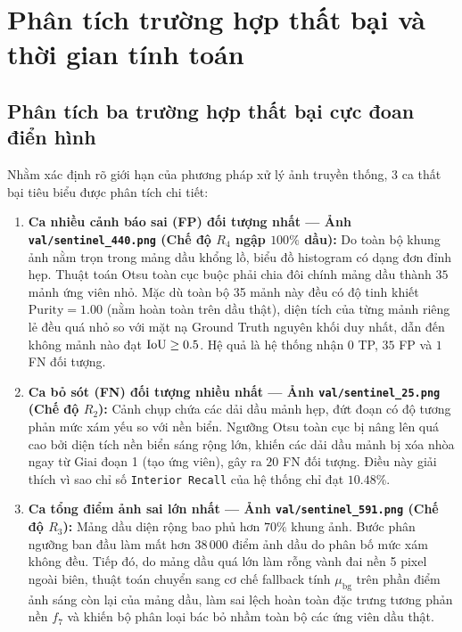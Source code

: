 \section{Phân tích trường hợp thất bại và thời gian tính toán}
\label{sec:that_bai_thoi_gian}

\subsection{Phân tích ba trường hợp thất bại cực đoan điển hình}

Nhằm xác định rõ giới hạn của phương pháp xử lý ảnh truyền thống, 3 ca thất bại tiêu biểu được phân tích chi tiết:

\begin{enumerate}
    \item \textbf{Ca nhiều cảnh báo sai (FP) đối tượng nhất --- Ảnh \texttt{val/sentinel\_440.png} (Chế độ $R_4$ ngập $100\%$ dầu):}
    Do toàn bộ khung ảnh nằm trọn trong mảng dầu khổng lồ, biểu đồ histogram có dạng đơn đỉnh hẹp. Thuật toán Otsu toàn cục buộc phải chia đôi chính mảng dầu thành $35$ mảnh ứng viên nhỏ. Mặc dù toàn bộ 35 mảnh này đều có độ tinh khiết $\mathrm{Purity} = 1.00$ (nằm hoàn toàn trên dầu thật), diện tích của từng mảnh riêng lẻ đều quá nhỏ so với mặt nạ Ground Truth nguyên khối duy nhất, dẫn đến không mảnh nào đạt $\mathrm{IoU} \ge 0.5$. Hệ quả là hệ thống nhận $0$ TP, $35$ FP và $1$ FN đối tượng.

    \item \textbf{Ca bỏ sót (FN) đối tượng nhiều nhất --- Ảnh \texttt{val/sentinel\_25.png} (Chế độ $R_2$):}
    Cảnh chụp chứa các dải dầu mảnh hẹp, đứt đoạn có độ tương phản mức xám yếu so với nền biển. Ngưỡng Otsu toàn cục bị nâng lên quá cao bởi diện tích nền biển sáng rộng lớn, khiến các dải dầu mảnh bị xóa nhòa ngay từ Giai đoạn 1 (tạo ứng viên), gây ra $20$ FN đối tượng. Điều này giải thích vì sao chỉ số \texttt{Interior Recall} của hệ thống chỉ đạt $10.48\%$.

    \item \textbf{Ca tổng điểm ảnh sai lớn nhất --- Ảnh \texttt{val/sentinel\_591.png} (Chế độ $R_3$):}
    Mảng dầu diện rộng bao phủ hơn $70\%$ khung ảnh. Bước phân ngưỡng ban đầu làm mất hơn $38\,000$ điểm ảnh dầu do phân bố mức xám không đều. Tiếp đó, do mảng dầu quá lớn làm rỗng vành đai nền 5 pixel ngoài biên, thuật toán chuyển sang cơ chế fallback tính $\mu_{\text{bg}}$ trên phần điểm ảnh sáng còn lại của mảng dầu, làm sai lệch hoàn toàn đặc trưng tương phản nền $f_7$ và khiến bộ phân loại bác bỏ nhầm toàn bộ các ứng viên dầu thật.
\end{enumerate}

